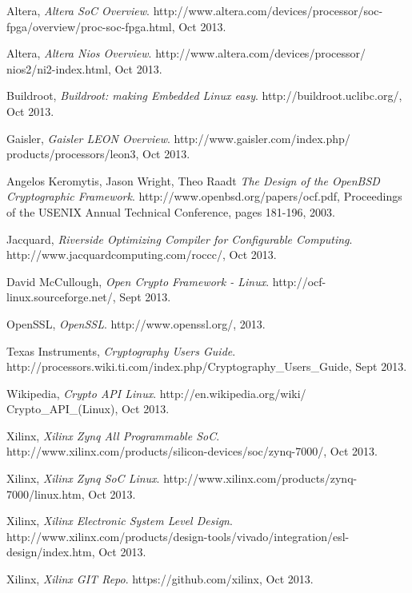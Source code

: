 \documentclass[journal]{IEEEtran}
\begin{document}
\begin{thebibliography}{1}

Altera,
 \emph{Altera SoC Overview}.    
 http://www.altera.com/devices/processor/soc-fpga/overview/proc-soc-fpga.html, Oct 2013.

Altera,
 \emph{Altera Nios Overview}.    
 http://www.altera.com/devices/processor/ nios2/ni2-index.html, Oct 2013.

Buildroot,
 \emph{Buildroot: making Embedded Linux easy}.    
 http://buildroot.uclibc.org/, Oct 2013.

Gaisler,
 \emph{Gaisler LEON Overview}.
 http://www.gaisler.com/index.php/ products/processors/leon3, Oct 2013.

Angelos Keromytis, Jason Wright, Theo Raadt
 \emph{The Design of the OpenBSD Cryptographic Framework}.    
 http://www.openbsd.org/papers/ocf.pdf, Proceedings of the USENIX Annual Technical Conference, pages 181-196, 2003.

Jacquard,
 \emph{Riverside Optimizing Compiler for Configurable Computing}.    
 http://www.jacquardcomputing.com/roccc/, Oct 2013. 
  
David McCullough,
 \emph{Open Crypto Framework - Linux}.    
 http://ocf-linux.sourceforge.net/, Sept 2013.

OpenSSL,
 \emph{OpenSSL}.    
 http://www.openssl.org/, 2013.

Texas Instruments,
 \emph{Cryptography Users Guide}.    
 http://processors.wiki.ti.com/index.php/Cryptography\_Users\_Guide, Sept 2013.
 
Wikipedia,
 \emph{Crypto API Linux}.    
 http://en.wikipedia.org/wiki/ Crypto\_API\_(Linux), Oct 2013.

Xilinx,
 \emph{Xilinx Zynq All Programmable SoC}.    
 http://www.xilinx.com/products/silicon-devices/soc/zynq-7000/, Oct 2013.
 
Xilinx,
 \emph{Xilinx Zynq SoC Linux}.    
 http://www.xilinx.com/products/zynq-7000/linux.htm, Oct 2013.
 
Xilinx,
 \emph{Xilinx Electronic System Level Design}.    
 http://www.xilinx.com/products/design-tools/vivado/integration/esl-design/index.htm, Oct 2013.
 
Xilinx,
 \emph{Xilinx GIT Repo}.    
 https://github.com/xilinx, Oct 2013.
 

\end{thebibliography}
\end{document}
